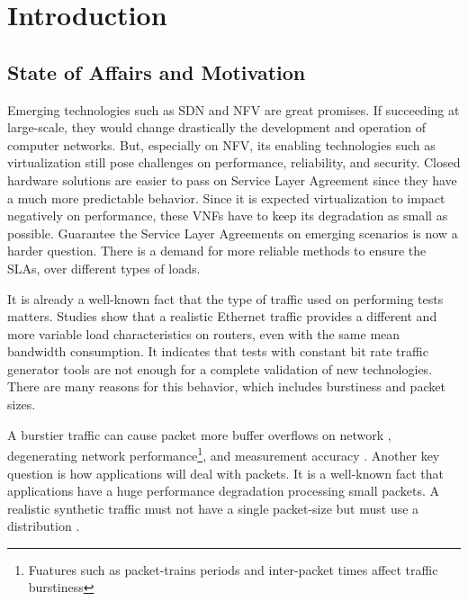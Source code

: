 \chapter{Introduction}\label{ch:introduction}

\section{State of Affairs and Motivation}\label{sec:state-of-the-art}
 

Emerging technologies such as SDN and NFV are great promises. If succeeding at large-scale, they would change drastically the development and operation of computer networks. But, especially on NFV, its enabling technologies such as virtualization still pose challenges on performance,  reliability, and security\cite{nfv-challenges}. Closed hardware solutions are easier to pass on Service Layer Agreement since they have a much more predictable behavior. Since it is expected virtualization to impact negatively on performance, these VNFs have to keep its degradation as small as possible. Guarantee the Service Layer Agreements on emerging scenarios is now a harder question. There is a demand for more reliable methods to ensure the SLAs, over different types of loads.


It is already a well-known fact that the type of traffic used on performing tests matters. Studies show that a realistic Ethernet traffic provides a different and more variable load characteristics on routers\cite{harpoon-validation}, even with the same mean bandwidth consumption. It indicates that tests with constant bit rate traffic generator tools are not enough for a complete validation of new technologies. There are many reasons for this behavior, which includes burstiness and packet sizes.


A burstier traffic can cause packet more buffer overflows on network \cite{burstiness-queue-lenght} \cite{modelling-of-self-similar} \cite{empirical-interarrival-study}, degenerating network performance\footnote{Fuatures such as packet-trains periods and inter-packet times affect traffic burstiness}, and  measurement accuracy\cite{legotg-paper} \cite{background-traffic-matter}. Another key question is how applications will deal with packets. It is a well-known fact that applications have a huge performance degradation processing small packets\cite{comparative-trafficgen-tools}. A realistic synthetic traffic must not have a single packet-size but must use a distribution \cite{packet-distribution-model}. 


